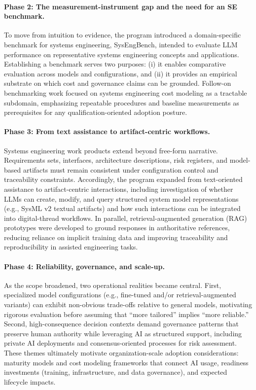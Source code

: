 \paragraph{Phase 2: The measurement-instrument gap and the need for an SE benchmark.}
To move from intuition to evidence, the program introduced a domain-specific benchmark for systems engineering, SysEngBench, intended to evaluate LLM performance on representative systems engineering concepts and applications. Establishing a benchmark serves two purposes: (i) it enables comparative evaluation across models and configurations, and (ii) it provides an empirical substrate on which cost and governance claims can be grounded. Follow-on benchmarking work focused on systems engineering cost modeling as a tractable subdomain, emphasizing repeatable procedures and baseline measurements as prerequisites for any qualification-oriented adoption posture.

\paragraph{Phase 3: From text assistance to artifact-centric workflows.}
Systems engineering work products extend beyond free-form narrative. Requirements sets, interfaces, architecture descriptions, risk registers, and model-based artifacts must remain consistent under configuration control and traceability constraints. Accordingly, the program expanded from text-oriented assistance to artifact-centric interactions, including investigation of whether LLMs can create, modify, and query structured system model representations (e.g., SysML v2 textual artifacts) and how such interactions can be integrated into digital-thread workflows. In parallel, retrieval-augmented generation (RAG) prototypes were developed to ground responses in authoritative references, reducing reliance on implicit training data and improving traceability and reproducibility in assisted engineering tasks.

\paragraph{Phase 4: Reliability, governance, and scale-up.}
As the scope broadened, two operational realities became central. First, specialized model configurations (e.g., fine-tuned and/or retrieval-augmented variants) can exhibit non-obvious trade-offs relative to general models, motivating rigorous evaluation before assuming that ``more tailored'' implies ``more reliable.'' Second, high-consequence decision contexts demand governance patterns that preserve human authority while leveraging AI as structured support, including private AI deployments and consensus-oriented processes for risk assessment. These themes ultimately motivate organization-scale adoption considerations: maturity models and cost modeling frameworks that connect AI usage, readiness investments (training, infrastructure, and data governance), and expected lifecycle impacts.

